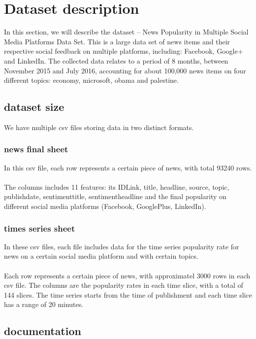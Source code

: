 \documentclass[10pt]{article}
\begin{document}
\section{Dataset description}
In this section, we will describe the dataset -- News Popularity in Multiple 
Social Media Platforms Data Set. This is a large data set of news items and 
their respective social feedback on multiple platforms, including: Facebook, 
Google+ and LinkedIn. The collected data relates to a period of 8 months, 
between November 2015 and July 2016, accounting for about 100,000 news items 
on four different topics: economy, microsoft, obama and palestine.

\subsection{dataset size}
We have multiple csv files storing data in two distinct formats.

\subsubsection{news final sheet}
In this csv file, each row represents a certain piece of news, with total 93240 
rows.\\\\ The columns includes 11 features: its IDLink, title, headline, source, 
topic, publishdate, sentimenttitle, sentimentheadline and the final popularity 
on different social media platforms (Facebook, GooglePlus, LinkedIn).

\subsubsection{times series sheet}
In these csv files, each file includes data for the time series popularity rate 
for news on a certain social media platform and with certain topics.\\\\
Each row represents a certain piece of news, with approximatel 3000 rows in each 
csv file. The columns are the popularity rates in each time slice, with a total of 
144 slices. The time series starts from the time of publishment and each time slice 
has a range of 20 minutes.

\subsection{documentation}
\end{document}
